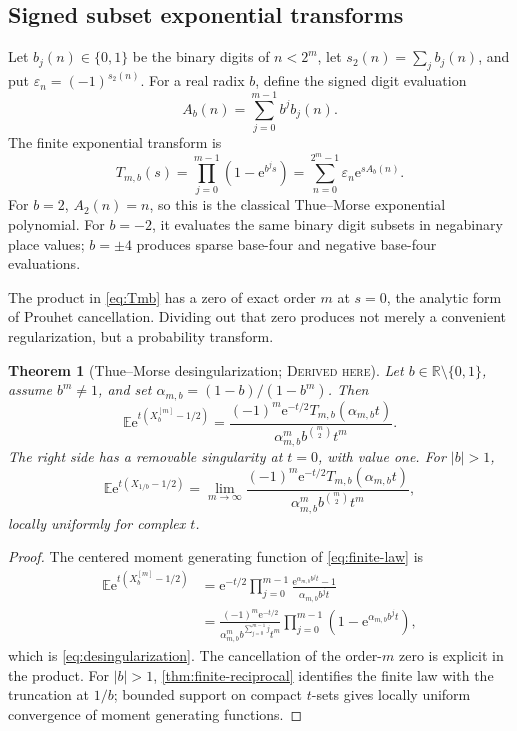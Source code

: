 \documentclass[11pt,oneside]{article}
\newtheorem{theorem}{Theorem}[section]
\theoremstyle{definition}
\theoremstyle{remark}
\newcommand{\R}{\mathbb R}
\newcommand{\E}{\mathbb E}
\newcommand{\e}{\mathrm e}
\newcommand{\epsTM}{\varepsilon}
\newcommand{\Derived}{\textsc{Derived here}}
\begin{document}
\subsection{Signed subset exponential transforms}
Let \(b_j(n)\in\{0,1\}\) be the binary digits of \(n<2^m\), let
\(s_2(n)=\sum_jb_j(n)\), and put \(\epsTM_n=(-1)^{s_2(n)}\).  For a real radix
\(b\), define the signed digit evaluation
\begin{equation}\label{eq:Ab}
 A_b(n)=\sum_{j=0}^{m-1}b^jb_j(n).
\end{equation}
The finite exponential transform is
\begin{equation}\label{eq:Tmb}
 T_{m,b}(s)=\prod_{j=0}^{m-1}(1-\e^{b^js})
 =\sum_{n=0}^{2^m-1}\epsTM_n\e^{sA_b(n)}.
\end{equation}
For \(b=2\), \(A_2(n)=n\), so this is the classical Thue--Morse exponential
polynomial.  For \(b=-2\), it evaluates the same binary digit subsets in
negabinary place values; \(b=\pm4\) produces sparse base-four and negative
base-four evaluations.

The product in \eqref{eq:Tmb} has a zero of exact order \(m\) at \(s=0\), the
analytic form of Prouhet cancellation.  Dividing out that zero produces not
merely a convenient regularization, but a probability transform.

\begin{theorem}[Thue--Morse desingularization; \Derived]\label{thm:desingularization}
Let \(b\in\R\setminus\{0,1\}\), assume \(b^m\ne1\), and set
\(\alpha_{m,b}=(1-b)/(1-b^m)\).  Then
\begin{equation}\label{eq:desingularization}
 \boxed{
 \E\e^{t(X_b^{[m]}-1/2)}
 =\frac{(-1)^m\e^{-t/2}T_{m,b}(\alpha_{m,b}t)}
 {\alpha_{m,b}^m b^{\binom m2}t^m}.}
\end{equation}
The right side has a removable singularity at \(t=0\), with value one.  For
\(|b|>1\),
\begin{equation}\label{eq:desingularization-limit}
 \E\e^{t(X_{1/b}-1/2)}
 =\lim_{m\to\infty}
 \frac{(-1)^m\e^{-t/2}T_{m,b}(\alpha_{m,b}t)}
 {\alpha_{m,b}^m b^{\binom m2}t^m},
\end{equation}
locally uniformly for complex \(t\).
\end{theorem}

\begin{proof}
The centered moment generating function of \eqref{eq:finite-law} is
\begin{align*}
 \E\e^{t(X_b^{[m]}-1/2)}
 &=\e^{-t/2}\prod_{j=0}^{m-1}
 \frac{\e^{\alpha_{m,b}b^jt}-1}{\alpha_{m,b}b^jt}\\
 &=\frac{(-1)^m\e^{-t/2}}
 {\alpha_{m,b}^mb^{\sum_{j=0}^{m-1}j}t^m}
 \prod_{j=0}^{m-1}(1-\e^{\alpha_{m,b}b^jt}),
\end{align*}
which is \eqref{eq:desingularization}.  The cancellation of the order-\(m\)
zero is explicit in the product.  For \(|b|>1\),
\cref{thm:finite-reciprocal} identifies the finite law with the truncation at
\(1/b\); bounded support on compact \(t\)-sets gives locally uniform convergence
of moment generating functions.
\end{proof}
\end{document}

